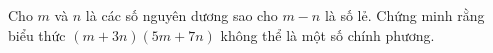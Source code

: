 \ifshowproblem
\begin{problem}\label{example:THA-2015-MO-P1}
    Cho \( m \) và \( n \) là các số nguyên dương sao cho \( m - n \) là số lẻ.  
    Chứng minh rằng biểu thức \( (m + 3n)(5m + 7n) \) không thể là một số chính phương.
\end{problem}
\fi

\footnotemark
{}
\fi